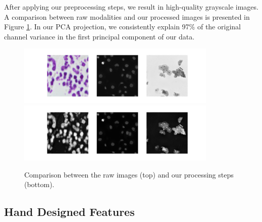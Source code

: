 \documentclass[paper=letter, fontsize=12pt]{article}
\numberwithin{equation}{section} %
\numberwithin{figure}{section} %
\numberwithin{table}{section} %
\begin{document}
After applying our preprocessing steps, we result in high-quality grayscale 
images.  A comparison between raw modalities and our processed images is 
presented in Figure \ref{fig:processing-results}.  In our PCA projection,
we consistently explain 97\% of the original channel variance in the first
principal component of our data.

\begin{figure}[H]
    \centering
    \includegraphics[width=0.85\textwidth]{./figs/raw-modalities.png}
    \includegraphics[width=0.85\textwidth]{./figs/processed-modalities.png}
    \caption{Comparison between the raw images (top) and our processing steps
    (bottom).}
    \label{fig:processing-results}
\end{figure}

\subsection{Hand Designed Features}
\end{document}
